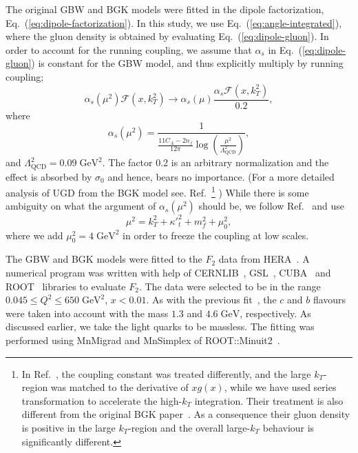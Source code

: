 \documentclass[12pt]{article}
\numberwithin{equation}{section}
\numberwithin{table}{section}
\numberwithin{figure}{section}
\newcommand{\GeV}[0]{\mathrm{GeV}}
\begin{document}
The original GBW and BGK models were fitted in the dipole factorization, Eq.~(\ref{eq:dipole-factorization}). In this study, we use Eq.~(\ref{eq:angle-integrated}), where the gluon density is obtained by evaluating Eq.~(\ref{eq:dipole-gluon}).
In order to account for the running coupling, we assume that $\alpha_s$ in Eq.~(\ref{eq:dipole-gluon}) is constant for the GBW model, and thus explicitly multiply by running coupling;
\begin{equation}
\alpha_s(\mu^2)\mathcal{F}(x,k_T^2)\rightarrow \alpha_s(\mu)\frac{\alpha_s\mathcal{F}(x,k_T^2)}{0.2},
\end{equation}
where %
\begin{equation}
\alpha_s(\mu^2)=\frac{1}{\frac{11 C_A-2n_f}{12\pi}\log\left(\frac{\mu^2}{\Lambda_{\mathrm{QCD}}^2 }\right)},
\end{equation}
and  $\Lambda_{\mathrm{QCD}}^2=0.09\;\GeV^2$.
The factor 0.2 is an arbitrary normalization and the effect is absorbed by $\sigma_0$ and hence, bears no importance.
(For a more detailed analysis of UGD from the BGK model see. Ref.~\cite{Luszczak:2022fkf}\footnote{In Ref.~\cite{Luszczak:2022fkf}, the coupling constant was treated differently, and the large $k_T$-region was matched to the derivative of $xg(x)$, while we have used series transformation to accelerate the high-$k_T$ integration. Their treatment is also different from the original BGK paper~\cite{Bartels:2002cj}. As a consequence their gluon density is positive in the large $k_T$-region and the overall large-$k_T$ behaviour is significantly different.}
)
While there is some ambiguity on what the argument of $\alpha_s(\mu^2)$ should be, we follow Ref.~\cite{Kwiecinski:1997ee} and use
\begin{equation}
	\mu^2=k_T^2+{\kappa'}_t^2+m_f^2+\mu^2_0,
\end{equation}
where we add $\mu^2_0=4\;\GeV^2$ in order to freeze the coupling at low scales.

The GBW and BGK models were fitted to the $F_2$ data from HERA~\cite{Abt:2017nkc}. A numerical program was written with help of CERNLIB~\cite{Kolbig:1972zz}, GSL~\cite{GSL}, CUBA~\cite{Hahn:2004fe} and ROOT~\cite{Brun:1997pa} libraries to evaluate $F_2$. The data were selected to be in the range $0.045\leq Q^2\leq 650\;\mathrm{GeV^2}$, $x<0.01$.
As with the previous fit~\cite{Goda:2022wsc}, the $c$ and $b$ flavours were taken into account with the mass $1.3$ and $4.6\;\mathrm{GeV}$, respectively. As discussed earlier, we take the light quarks to be massless.
The fitting was performed using MnMigrad and MnSimplex of ROOT::Minuit2~\cite{James:2004xla}.
\end{document}
